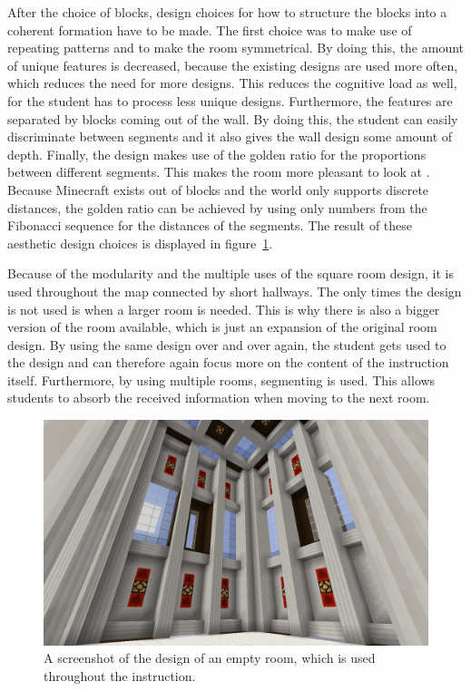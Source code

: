 \documentclass[11pt,twoside]{report} %
\begin{document}
After the choice of blocks, design choices for how to structure the blocks into a coherent formation have to be made. The first choice was to make use of repeating patterns and to make the room symmetrical. By doing this, the amount of unique features is decreased, because the existing designs are used more often, which reduces the need for more designs. This reduces the cognitive load as well, for the student has to process less unique designs. Furthermore, the features are separated by blocks coming out of the wall. By doing this, the student can easily discriminate between segments and it also gives the wall design some amount of depth. Finally, the design makes use of the golden ratio for the proportions between different segments. This makes the room more pleasant to look at \cite{livio}. Because Minecraft exists out of blocks and the world only supports discrete distances, the golden ratio can be achieved by using only numbers from the Fibonacci sequence for the distances of the segments. The result of these aesthetic design choices is displayed in figure~\ref{fig:roomdesign}.

Because of the modularity and the multiple uses of the square room design, it is used throughout the map connected by short hallways. The only times the design is not used is when a larger room is needed. This is why there is also a bigger version of the room available, which is just an expansion of the original room design. By using the same design over and over again, the student gets used to the design and can therefore again focus more on the content of the instruction itself. Furthermore, by using multiple rooms, segmenting is used. This allows students to absorb the received information when moving to the next room.

\begin{figure}[h]
\centering
\includegraphics[width=\textwidth]{roomdesign}
\caption{A screenshot of the design of an empty room, which is used throughout the instruction.\label{fig:roomdesign}}
\end{figure}
\end{document}
